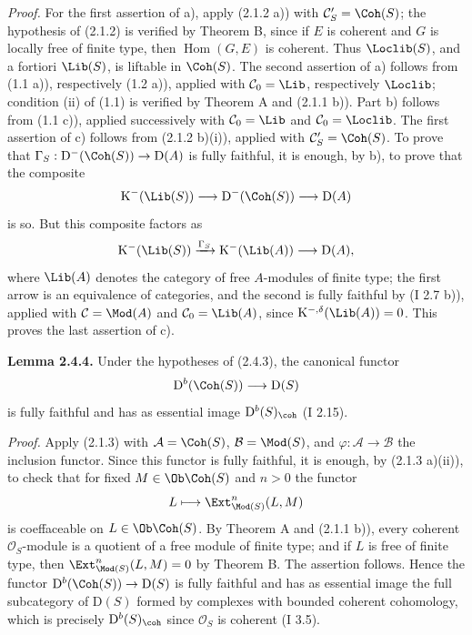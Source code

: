 \documentclass[11pt]{article}
\begin{document}
\emph{Proof.} For the first assertion of a), apply (2.1.2 a)) with $\mathcal C'_S=\Coh(S)$; the hypothesis of (2.1.2) is verified by Theorem B, since if $E$ is coherent and $G$ is locally free of finite type, then $\operatorname{Hom}(G,E)$ is coherent. Thus $\Loclib(S)$, and a fortiori $\Lib(S)$, is liftable in $\Coh(S)$. The second assertion of a) follows from (1.1 a)), respectively (1.2 a)), applied with $\mathcal C_0=\Lib$, respectively $\Loclib$; condition (ii) of (1.1) is verified by Theorem A and (2.1.1 b)). Part b) follows from (1.1 c)), applied successively with $\mathcal C_0=\Lib$ and $\mathcal C_0=\Loclib$. The first assertion of c) follows from (2.1.2 b)(i)), applied with $\mathcal C'_S=\Coh(S)$. To prove that $\Gamma_S:\mathrm D^{-}(\Coh(S))\to\mathrm D(A)$ is fully faithful, it is enough, by b), to prove that the composite
\[
\mathrm K^{-}(\Lib(S))\longrightarrow\mathrm D^{-}(\Coh(S))\longrightarrow\mathrm D(A)
\]
is so. But this composite factors as
\[
\mathrm K^{-}(\Lib(S))\xrightarrow{\Gamma_S}\mathrm K^{-}(\Lib(A))\longrightarrow\mathrm D(A),
\]
where $\Lib(A)$ denotes the category of free $A$-modules of finite type; the first arrow is an equivalence of categories, and the second is fully faithful by (I 2.7 b)), applied with $\mathcal C=\Mod(A)$ and $\mathcal C_0=\Lib(A)$, since $\mathrm K^{-,\delta}(\Lib(A))=0$. This proves the last assertion of c).

\textbf{Lemma 2.4.4.} Under the hypotheses of (2.4.3), the canonical functor
\[
\mathrm D^b(\Coh(S))\longrightarrow\mathrm D(S)
\]
is fully faithful and has as essential image $\mathrm D^b(S)_{\coh}$ (I 2.15).

\emph{Proof.} Apply (2.1.3) with $\mathcal A=\Coh(S)$, $\mathcal B=\Mod(S)$, and $\varphi:\mathcal A\to\mathcal B$ the inclusion functor. Since this functor is fully faithful, it is enough, by (2.1.3 a)(ii)), to check that for fixed $M\in\Ob\Coh(S)$ and $n>0$ the functor
\[
L\longmapsto \Ext^n_{\Mod(S)}(L,M)
\]
is coeffaceable on $L\in\Ob\Coh(S)$. By Theorem A and (2.1.1 b)), every coherent $\mathcal O_S$-module is a quotient of a free module of finite type; and if $L$ is free of finite type, then $\Ext^n_{\Mod(S)}(L,M)=0$ by Theorem B. The assertion follows. Hence the functor $\mathrm D^b(\Coh(S))\to\mathrm D(S)$ is fully faithful and has as essential image the full subcategory of $\mathrm D(S)$ formed by complexes with bounded coherent cohomology, which is precisely $\mathrm D^b(S)_{\coh}$ since $\mathcal O_S$ is coherent (I 3.5).
\end{document}
